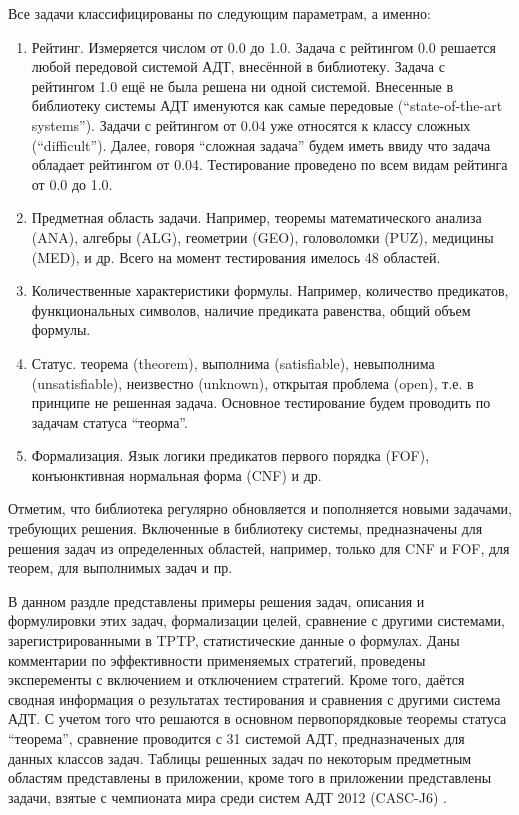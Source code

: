 Все задачи классифицированы по следующим параметрам, а именно:
\begin{enumerate}
\item {Рейтинг.} Измеряется числом от 0.0 до 1.0. Задача с рейтингом 0.0 решается любой передовой системой АДТ, внесённой в библиотеку. Задача с рейтингом 1.0 ещё не была решена ни одной системой. Внесенные в библиотеку системы АДТ именуются как  самые передовые (``state-of-the-art systems''). Задачи с рейтингом от 0.04 уже относятся к классу сложных (``difficult''). Далее, говоря ``сложная задача'' будем иметь ввиду что задача обладает рейтингом от 0.04. Тестирование проведено по всем видам рейтинга от 0.0 до 1.0.
\item {Предметная область задачи.} Например, теоремы математического анализа (ANA), алгебры (ALG), геометрии (GEO), головоломки (PUZ), медицины (MED), и др. Всего на момент тестирования имелось 48 областей.
\item {Количественные характеристики формулы.} Например, количество предикатов, функциональных символов, наличие предиката равенства, общий объем формулы.
\item {Статус.} теорема (theorem), выполнима (satisfiable), невыполнима (unsatisfiable), неизвестно (unknown), открытая проблема (open), т.е. в принципе не решенная задача. Основное тестирование будем проводить по задачам статуса ``теорма''.
\item {Формализация.} Язык логики предикатов первого порядка (FOF), конъюнктивная нормальная форма (CNF) и др.  
\end{enumerate}

Отметим, что библиотека регулярно обновляется и пополняется новыми задачами, требующих решения. Включенные в библиотеку системы, предназначены для решения задач из определенных областей, например, только для CNF и FOF, для теорем, для выполнимых задач и пр. 

В данном раздле представлены примеры решения задач, описания и формулировки этих задач, формализации целей, сравнение с другими системами, зарегистрированными в TPTP, статистические данные о формулах. Даны комментарии по эффективности применяемых стратегий, проведены эксперементы с включением и отключением стратегий. Кроме того, даётся сводная информация о результатах тестирования и сравнения с другими система АДТ. С учетом того что решаются в основном первопорядковые теоремы статуса ``теорема'', сравнение проводится с 31 системой АДТ, предназначеных для данных классов задач. Таблицы решенных задач по некоторым предметным областям представлены в приложении, кроме того в приложении представлены задачи, взятые с чемпионата мира среди систем АДТ 2012 (CASC-J6) \cite{CASC}.



